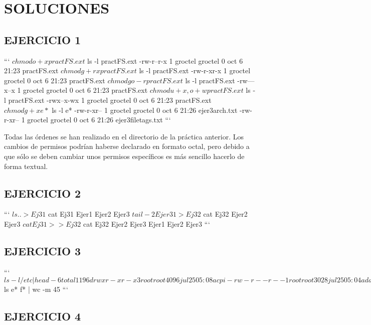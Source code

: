 \section{SOLUCIONES}

\subsection{EJERCICIO 1}

```
$ chmod o+x practFS.ext
$ ls -l practFS.ext
  -rw-r--r-x 1 groctel groctel 0 oct  6 21:23 practFS.ext
$ chmod g+rx practFS.ext
$ ls -l practFS.ext
  -rw-r-xr-x 1 groctel groctel 0 oct  6 21:23 practFS.ext
$ chmod go-r practFS.ext
$ ls -l practFS.ext
  -rw---x--x 1 groctel groctel 0 oct  6 21:23 practFS.ext
$ chmod u+x,o+w practFS.ext
$ ls -l practFS.ext
  -rwx--x-wx 1 groctel groctel 0 oct  6 21:23 practFS.ext
$ chmod g+x e*
$ ls -l e*
  -rw-r-xr-- 1 groctel groctel 0 oct  6 21:26 ejer3arch.txt
  -rw-r-xr-- 1 groctel groctel 0 oct  6 21:26 ejer3filetags.txt
```

Todas las órdenes se han realizado en el directorio  de la práctica anterior. Los cambios de permisos podrían haberse declarado en formato octal, pero debido a que sólo se deben cambiar unos permisos específicos es más sencillo hacerlo de forma textual.

\subsection{EJERCICIO 2}

```
$ ls .. > Ej31
$ cat Ej31
  Ejer1
  Ejer2
  Ejer3
$ tail -2 Ejer31 > Ej32
$ cat Ej32
  Ejer2
  Ejer3
$ cat Ej31 >> Ej32
$ cat Ej32
  Ejer2
  Ejer3
  Ejer1
  Ejer2
  Ejer3
```

\subsection{EJERCICIO 3}

```
$ ls -l /etc | head -6
  total 1196
  drwxr-xr-x  3 root root     4096 jul 25 05:08 acpi
  -rw-r--r--  1 root root     3028 jul 25 05:04 adduser.conf
  drwxr-xr-x  2 root root    12288 sep 23 09:58 alternatives
  -rw-r--r--  1 root root      401 may 29  2017 anacrontab
  -rw-r--r--  1 root root      433 oct  2  2017 apg.conf
$ ls e* f* | wc -m
  45
```

\subsection{EJERCICIO 4}

